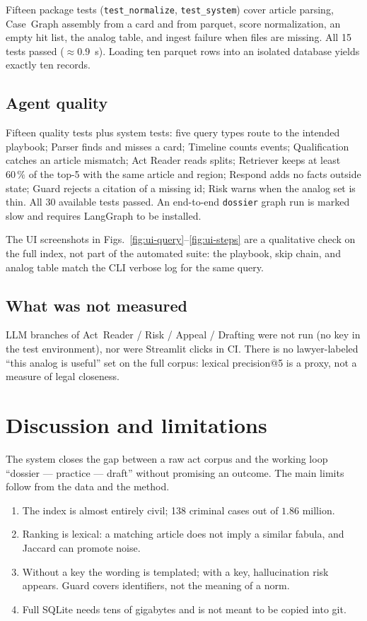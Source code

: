 \documentclass[preprint,12pt]{elsarticle}
\begin{document}
Fifteen package tests (\texttt{test\_normalize}, \texttt{test\_system}) cover article parsing, Case~Graph assembly from a card and from parquet, score normalization, an empty hit list, the analog table, and ingest failure when files are missing. All 15 tests passed ($\approx 0.9$~s). Loading ten parquet rows into an isolated database yields exactly ten records.

\subsection{Agent quality}

Fifteen quality tests plus system tests: five query types route to the intended playbook; Parser finds and misses a card; Timeline counts events; Qualification catches an article mismatch; Act Reader reads splits; Retriever keeps at least $60\,\%$ of the top-5 with the same article and region; Respond adds no facts outside state; Guard rejects a citation of a missing id; Risk warns when the analog set is thin. All 30 available tests passed. An end-to-end \texttt{dossier} graph run is marked slow and requires LangGraph to be installed.

The UI screenshots in Figs.~\ref{fig:ui-query}--\ref{fig:ui-steps} are a qualitative check on the full index, not part of the automated suite: the playbook, skip chain, and analog table match the CLI verbose log for the same query.

\subsection{What was not measured}

LLM branches of Act~Reader / Risk / Appeal / Drafting were not run (no key in the test environment), nor were Streamlit clicks in CI. There is no lawyer-labeled ``this analog is useful'' set on the full corpus: lexical precision@5 is a proxy, not a measure of legal closeness.

\section{Discussion and limitations}

The system closes the gap between a raw act corpus and the working loop ``dossier --- practice --- draft'' without promising an outcome. The main limits follow from the data and the method.

\begin{enumerate}
\item The index is almost entirely civil; 138 criminal cases out of $1.86$ million.
\item Ranking is lexical: a matching article does not imply a similar fabula, and Jaccard can promote noise.
\item Without a key the wording is templated; with a key, hallucination risk appears. Guard covers identifiers, not the meaning of a norm.
\item Full SQLite needs tens of gigabytes and is not meant to be copied into git.
\end{enumerate}
\end{document}
